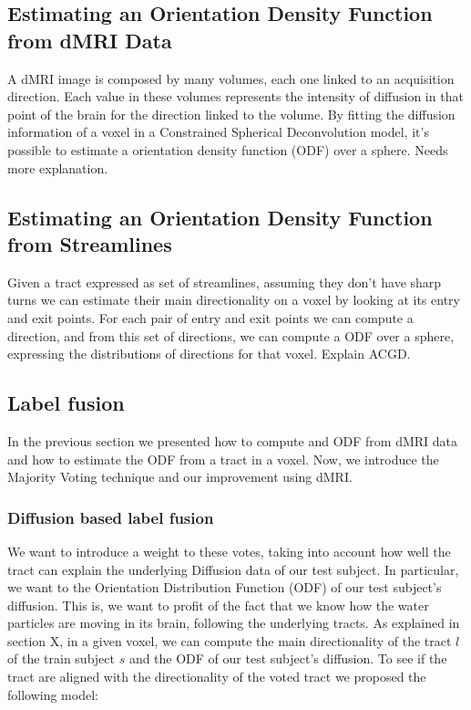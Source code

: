 \subsection{Estimating an Orientation Density Function from dMRI Data}
A dMRI image is composed by many volumes, each one linked to an acquisition
direction. Each value in these volumes represents the intensity of diffusion
in that point of the brain for the direction linked to the volume. By fitting
the diffusion information of a voxel in a Constrained Spherical Deconvolution
model, it's possible to estimate a orientation density function (ODF) over a
sphere. Needs more explanation.

\subsection{Estimating an Orientation Density Function from Streamlines}
Given a tract expressed as set of streamlines, assuming they don't have sharp
turns we can estimate their main directionality on a voxel by looking at its
entry and exit points. For each pair of entry and exit points we can compute a
direction, and from this set of directions, we can compute a ODF over a sphere,
expressing the distributions of directions for that voxel. Explain ACGD.

\subsection{Label fusion}
In the previous section we presented how to compute and ODF from dMRI data and
how to estimate the ODF from a tract in a voxel. Now, we introduce the Majority
Voting technique and our improvement using dMRI.


\subsubsection{Diffusion based label fusion}
We want to introduce a weight to these votes, taking into account how well the
tract can explain the underlying Diffusion data of our test subject. In
particular, we want to the Orientation Distribution Function (ODF) of our
test subject's diffusion. This is, we want to profit of the fact that we know
how the water particles are moving in its brain, following the underlying tracts.
As explained in section X, in a given voxel, we can compute the main
directionality of the tract $l$ of the train subject $s$ and the ODF of our
test subject's diffusion. To see if the tract are aligned with the
directionality of the voted tract we proposed the following model:

